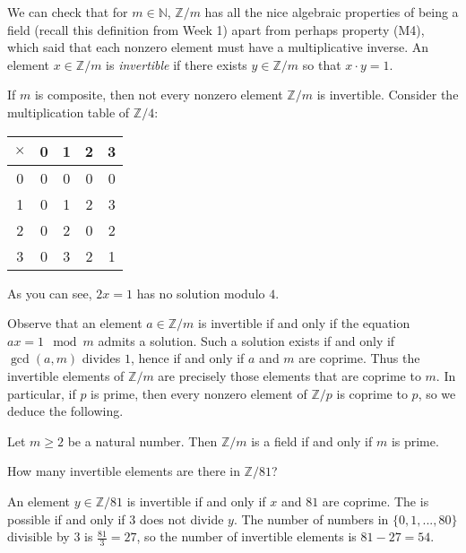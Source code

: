 \documentclass[11pt,dvipsnames]{book}
\numberwithin{figure}{section} %
\numberwithin{table}{section} %
\begin{document}
We can check that for $m\in\mathbb{N}$, $\mathbb{Z}/m$ has all the nice algebraic properties of being a field (recall this definition from Week 1) apart from perhaps property (M4), which said that each nonzero element must have a multiplicative inverse.
An element $x\in \mathbb{Z}/m$ is {\it invertible} if there exists $y\in \mathbb{Z}/m$ so that $x\cdot y=1$.

If $m$ is composite, then not every nonzero element $\mathbb{Z}/m$ is invertible.
Consider the multiplication table of $\mathbb{Z}/4$:
\begin{center}
\begin{tabular}{| c| c | c | c | c |}
\hline
{$\times$} & {0} & {1} & {2} & {3} \\
\hline
{0} & {0} & {0} & {0} & {0}  \\
\hline
{1} & {0} & {1} & {2} & {3}  \\
\hline
{2} & {0} & {2} & {0} & {2}  \\
\hline
{3} & {0} & {3} & {2} & {1}  \\
\hline
\end{tabular}
\end{center}
As you can see, $2x=1$ has no solution modulo $4$.

Observe that an element $a \in \mathbb{Z}/m$ is invertible if and only if the equation $ax = 1 \mod m$ admits a solution.
Such a solution exists if and only if $\gcd(a,m)$ divides $1$, hence if and only if $a$ and $m$ are coprime.
Thus the invertible elements of $\mathbb{Z}/m$ are precisely those elements that are coprime to $m$.
In particular, if $p$ is prime, then every nonzero element of $\mathbb{Z}/p$ is coprime to $p$, so we deduce the following.

\begin{proposition}
Let $m\geq 2$ be a natural number.
Then $\mathbb{Z}/m$ is a field if and only if $m$ is prime.
\end{proposition}

\begin{exercise}
How many invertible elements are there in $\mathbb{Z}/{81}$?
\end{exercise}

\begin{solution}
An element $y\in\mathbb{Z}/{81}$ is invertible if and only if $x$ and $81$ are coprime.
The is possible if and only if $3$ does not divide $y$.
The number of numbers in $\{0,1,...,80\}$ divisible by $3$ is $\frac{81}{3}=27$, so the number of invertible elements is $81-27 = 54$.
\end{solution}
\end{document}
